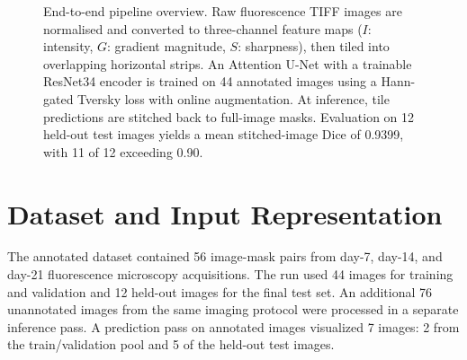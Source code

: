 \documentclass[11pt,letterpaper]{article}
\begin{document}
\begin{figure}[htbp]
{%
}
\caption{End-to-end pipeline overview. Raw fluorescence TIFF images are normalised and converted to three-channel feature maps ($I$: intensity, $G$: gradient magnitude, $S$: sharpness), then tiled into overlapping horizontal strips. An Attention U-Net with a trainable ResNet34 encoder is trained on 44 annotated images using a Hann-gated Tversky loss with online augmentation. At inference, tile predictions are stitched back to full-image masks. Evaluation on 12 held-out test images yields a mean stitched-image Dice of 0.9399, with 11 of 12 exceeding 0.90.}
\label{fig:pipeline-overview}
\end{figure}

\section{Dataset and Input Representation}
The annotated dataset contained 56 image-mask pairs from day-7, day-14, and day-21 fluorescence microscopy acquisitions. The run used 44 images for training and validation and 12 held-out images for the final test set. An additional 76 unannotated images from the same imaging protocol were processed in a separate inference pass. A prediction pass on annotated images visualized 7 images: 2 from the train/validation pool and 5 of the held-out test images.
\end{document}
